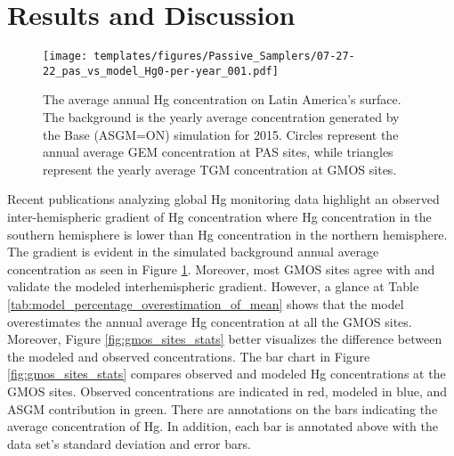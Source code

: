 \section{Results and Discussion}\label{c2_results}
\begin{figure}[H]
\centering
  \texttt{[image: templates/figures/Passive\_Samplers/07-27-22\_pas\_vs\_model\_Hg0-per-year\_001.pdf]}
  \caption[The average annual Hg concentration on Latin America's surface. ]{The average annual Hg concentration on Latin America's surface. The background is the yearly average \hg concentration generated by the Base (ASGM=ON) simulation for 2015. Circles represent the annual average GEM concentration at PAS sites, while triangles represent the yearly average TGM concentration at GMOS sites\cite{sprovieri_atmospheric_2016,quant_measuring_2021,koenig_seasonal_2021}.}
  \label{fig:06-12-22_pas_vs_model_Hg0-per-year_001}
  
  
\end{figure}
\FloatBarrier
\begin{flushleft}
 Recent publications analyzing global Hg monitoring data highlight an observed inter-hemispheric gradient of Hg concentration where Hg concentration in the southern hemisphere is lower than Hg concentration in the northern hemisphere\cite{united_nations_environment_programme_technical_2019,sprovieri_atmospheric_2016}. The gradient is evident in the simulated background annual average \hg concentration as seen in Figure \ref{fig:06-12-22_pas_vs_model_Hg0-per-year_001}. Moreover, most GMOS sites agree with and validate the modeled interhemispheric gradient. However, a glance at Table \ref{tab:model_percentage_overestimation_of_mean} shows that the model overestimates the annual average Hg concentration at all the GMOS sites. Moreover, Figure \ref{fig:gmos_sites_stats} better visualizes the difference between the modeled and observed concentrations. The bar chart in Figure \ref{fig:gmos_sites_stats} compares observed and modeled Hg concentrations at the GMOS sites. Observed concentrations are indicated in red, modeled in blue, and ASGM contribution in green. There are annotations on the bars indicating the average concentration of Hg. In addition, each bar is annotated above with the data set's standard deviation and error bars.
\end{flushleft}



